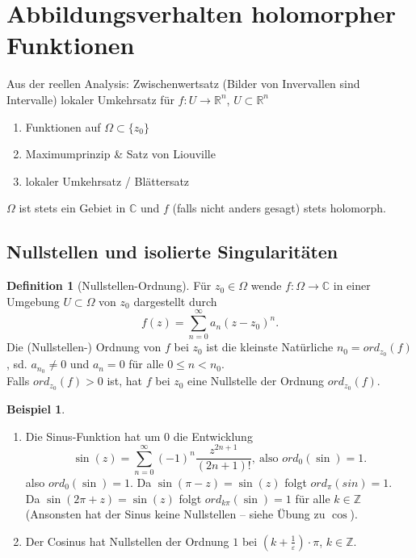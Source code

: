 \documentclass[11pt,titlepage]{article}
\theoremstyle{definition}
\newtheorem{definition}[theorem]{Definition}
\newtheorem{example}[theorem]{Beispiel}
\theoremstyle{remark}
\begin{document}
	\section{Abbildungsverhalten holomorpher Funktionen}
	
	Aus der reellen Analysis: Zwischenwertsatz (Bilder von Invervallen sind Intervalle) lokaler 
	Umkehrsatz für $f:U\to\mathbb{R}^n$, $U\subset\mathbb{R}^n$ 
	\begin{enumerate}
		\item Funktionen auf $\Omega\subset\{z_0\}$
		\item Maximumprinzip \& Satz von Liouville
		\item lokaler Umkehrsatz / Blättersatz
	\end{enumerate}
	$\Omega$ ist stets ein Gebiet in $\mathbb{C}$ und $f$ (falls nicht anders gesagt) stets holomorph.
	
	\subsection{Nullstellen und isolierte Singularitäten}
	
	\begin{definition}[Nullstellen-Ordnung]
		Für $z_0\in\Omega$ wende $f:\Omega\to\mathbb{C}$ in einer Umgebung $U\subset\Omega$ 
		von $z_0$ dargestellt durch
		\[ f(z)=\sum_{n=0}^{\infty} a_n (z-z_0)^n .\]
		Die (Nullstellen-) Ordnung von $f$ bei $z_0$ ist die kleinste Natürliche $n_0 =ord_{z_0}(f)$, sd. 
		$a_{n_0} \neq 0$ und $a_n =0$ für alle $0\leq n<n_0$. \\
		Falls $ord_{z_0} (f)>0$ ist, hat $f$ bei $z_0$ eine Nullstelle der Ordnung $ord_{z_0} (f)$.
	\end{definition}
	
	\begin{example}
		\begin{enumerate}
			\item Die Sinus-Funktion hat um $0$ die Entwicklung
			\[ \sin(z)=\sum_{n=0}^{\infty} (-1)^n \frac{ z^{2n+1}}{(2n+1)!},\ \text{also $ord_0 (\sin)=1$.}\]
			also $ord_0 (\sin)=1$. Da $\sin(\pi -z)=\sin(z)$ folgt $ord_{\pi}(sin)=1$. \\
			Da $\sin(2\pi +z)=\sin(z)$ folgt $ord_{k\pi}(\sin)=1$ für alle $k\in\mathbb{Z}$ (Ansonsten 
			hat der Sinus keine Nullstellen – siehe Übung zu $\cos$).
			\item Der Cosinus hat Nullstellen der Ordnung $1$ bei $(k+\frac{1}{\varepsilon})\cdot \pi$, 
			$k\in\mathbb{Z}$.
		\end{enumerate}
	\end{example}
	
\end{document}
